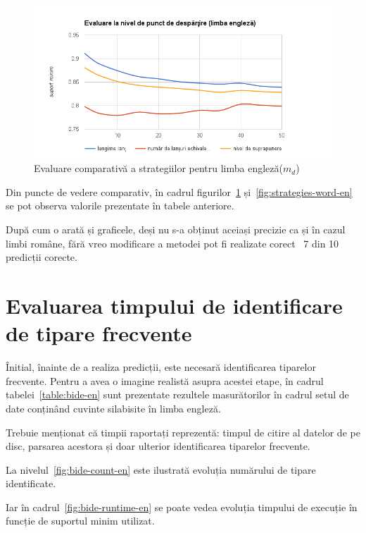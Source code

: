 \begin{figure}[h!]
    \centering
    \includegraphics[width=1\textwidth]{figures/strategies-point-en.png}
    \caption{Evaluare comparativă a strategiilor pentru limba engleză($m_d$)}
    \label{fig:strategies-point-en}
\end{figure}


Din puncte de vedere comparativ, în cadrul figurilor~\ref{fig:strategies-point-en} și~\ref{fig:strategies-word-en} se pot observa valorile prezentate în tabele anteriore.

După cum o arată și graficele, deși nu s-a obținut aceiași precizie ca și în cazul limbi române, fără vreo modificare a metodei pot fi realizate corect ~7 din 10 predicții corecte. 

\section{Evaluarea timpului de identificare de tipare frecvente}

Înitial, înainte de a realiza predicții, este necesară identificarea tiparelor frecvente. Pentru a avea o imagine realistă asupra acestei etape, în cadrul tabelei~\ref{table:bide-en} sunt prezentate rezultele masurătorilor în cadrul setul de date conținând cuvinte silabisite în limba engleză.

Trebuie menționat că timpii raportați reprezentă: timpul de citire al datelor de pe disc, parsarea acestora și doar ulterior identificarea tiparelor frecvente.

La nivelul~\ref{fig:bide-count-en} este ilustrată evoluția numărului de tipare identificate.

Iar în cadrul~\ref{fig:bide-runtime-en} se poate vedea evoluția timpului de execuție în funcție de suportul minim utilizat.

